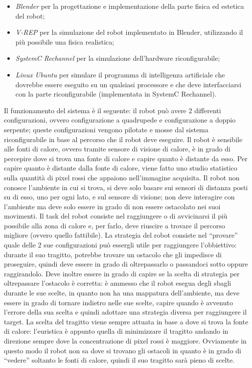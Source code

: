 \documentclass[11pt]{article} %
\begin{document}
\begin{itemize}
  \item \textit{Blender} per la progettazione e implementazione della parte fisica ed estetica del robot;
  \item \textit{V-REP} per la simulazione del robot implementato in Blender, utilizzando il più possibile una fisica realistica;
  \item \textit{SystemC Rechannel} per la simulazione dell'hardware riconfigurabile;
  \item \textit{Linux Ubuntu} per simulare il programma di intelligenza artificiale che dovrebbe essere eseguito su un qualsiasi processore e che deve interfacciarsi con la parte riconfigurabile (implementata in SystemC Rechannel).
\end{itemize}

Il funzionamento del sistema è il seguente: il robot può avere 2 differenti configurazioni, ovvero configurazione a quadrupede e configurazione a doppio serpente; queste configurazioni vengono pilotate e mosse dal sistema riconfigurabile in base al percorso che il robot deve eseguire. Il robot è sensibile alle fonti di calore, ovvero tramite sensore di visione di calore, è in grado di percepire dove si trova una fonte di calore e capire quanto è distante da esso. Per capire quanto è distante dalla fonte di calore, viene fatto uno studio statistico sulla quantità di pixel rossi che appaiono nell'immagine acquisita.
Il robot non conosce l'ambiente in cui si trova, si deve solo basare sui sensori di distanza posti su di esso, uno per ogni lato, e sul sensore di visione; non deve interagire con l'ambiente ma deve solo essere in grado di non essere ostacolato nei suoi movimenti. Il task del robot consiste nel raggiungere o di avvicinarsi il più possibile alla zona di calore e, per farlo, deve riuscire a trovare il percorso migliore (ovvero quello fattibile).
La strategia del robot consiste nel ``provare'' quale delle 2 sue configurazioni può essergli utile per raggiungere l'obbiettivo: durante il suo tragitto, potrebbe trovare un ostacolo che gli impedisce di proseguire, quindi deve essere in grado di oltrepassarlo o passandoci sotto oppure raggirandolo. Deve inoltre essere in grado di capire se la scelta di strategia per oltrepassare l'ostacolo è corretta: è ammesso che il robot esegua degli sbagli durante le sue scelte, in quanto non ha una mappatura dell'ambiente, ma deve essere in grado di tornare indietro nelle sue scelte, capire quando è avvenuto l'errore della sua scelta e quindi adottare una strategia diversa per raggiungere il target.
La scelta del tragitto viene sempre attuata in base a dove si trova la fonte di calore: l'euristica è appunto quella di minimizzare il tragitto andando in direzione sempre dove la concentrazione di pixel rossi è maggiore. Ovviamente in questo modo il robot non sa dove si trovano gli ostacoli in quanto è in grado di ``vedere'' soltanto le fonti di calore, quindi il suo tragitto sarà pieno di scelte.
\end{document}
